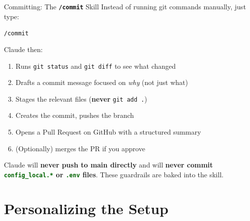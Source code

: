 \documentclass[aspectratio=169,11pt,dvipsnames]{beamer}
\newcommand{\skill}[1]{\texttt{\textcolor{defaultclr}{\textbf{/#1}}}}
\newcommand{\file}[1]{\textcolor{darkgreen}{\nolinkurl{#1}}}
\begin{document}
\begin{frame}{Committing: The \skill{commit} Skill}
  Instead of running git commands manually, just type:
  \begin{center}
    \Large\texttt{/commit}
  \end{center}
  Claude then:
  \begin{enumerate}\setlength\itemsep{4pt}
    \item Runs \texttt{git status} and \texttt{git diff} to see what changed
    \item Drafts a commit message focused on \emph{why} (not just what)
    \item Stages the relevant files (\textbf{never} \texttt{git add .})
    \item Creates the commit, pushes the branch
    \item Opens a Pull Request on GitHub with a structured summary
    \item (Optionally) merges the PR if you approve
  \end{enumerate}
  \vspace{0.2cm}
  \begin{alertbox}
    \small Claude will \textbf{never push to main directly} and will \textbf{never commit
    \file{config_local.*} or \file{.env} files}. These guardrails are baked into the skill.
  \end{alertbox}
\end{frame}

\section{Personalizing the Setup}
\end{document}
